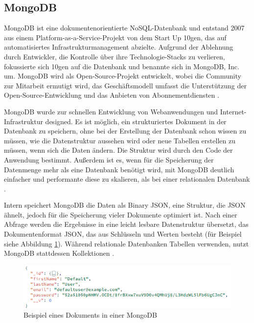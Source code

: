 \subsection{MongoDB}
MongoDB ist eine dokumentenorientierte NoSQL-Datenbank und entstand 2007 aus einem Platform-as-a-Service-Projekt von dem Start Up 10gen, das auf automatisiertes Infrastrukturmanagement abzielte. 
Aufgrund der Ablehnung durch Entwickler, die Kontrolle über ihre Technologie-Stacks zu verlieren, fokussierte sich 10gen auf die Datenbank und benannte sich in MongoDB, Inc. um. 
MongoDB wird als Open-Source-Projekt entwickelt, wobei die Community zur Mitarbeit ermutigt wird, das Geschäftsmodell umfasst die Unterstützung der Open-Source-Entwicklung und das Anbieten von Abonnementdiensten \cite[S.5 f.]{Banker2016MongoDB}.

MongoDB wurde zur schnellen Entwicklung von Webanwendungen und Internet-Infrastruktur designed. 
Es ist möglich, ein strukturiertes Dokument in der Datenbank zu speichern, ohne bei der Erstellung der Datenbank schon wissen zu müssen, wie die Datenstruktur aussehen wird oder neue Tabellen erstellen zu müssen, wenn sich die Daten ändern. 
Die Struktur wird durch den Code der Anwendung bestimmt. Außerdem ist es, wenn für die Speicherung der Datenmenge mehr als eine Datenbank benötigt wird, mit MongoDB deutlich einfacher und performante diese zu skalieren, als bei einer relationalen Datenbank \cite[S.4 ff.]{Banker2016MongoDB}. 

Intern speichert MongoDB die Daten als Binary \ac{JSON}, eine Struktur, die JSON ähnelt, jedoch für die Speicherung vieler Dokumente optimiert ist. 
Nach einer Abfrage werden die Ergebnisse in eine leicht lesbare Datenstruktur übersetzt, das Dokumentenformat JSON, das aus Schlüsseln und Werten besteht (für Beispiel siehe Abbildung \ref{MongoDB_Document}). 
Während relationale Datenbanken Tabellen verwenden, nutzt MongoDB stattdessen Kollektionen \cite[S.7]{Banker2016MongoDB}.

\begin{figure}[h]
    \centering
    \includegraphics[clip,width=0.5\linewidth]{images/MongoDB_Document.png}
    \caption[Beispiel eines Dokuments in einer MongoDB]{Beispiel eines Dokuments in einer MongoDB}
    \label{MongoDB_Document}
\end{figure}

